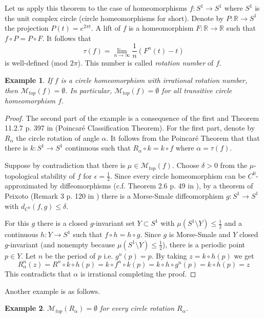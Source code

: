 \documentclass[11pt,letterpaper]{amsart}
\theoremstyle{plain}
\newtheorem{example}{Example}
\begin{document}
Let us apply this theorem to the case of homeomorphisms $f:S^1\to S^1$
where $S^1$ is the unit complex circle (circle homeomorphisms for short).
Denote by $P:\mathbb{R}\to S^1$ the projection
$P(t)=e^{2\pi t}$.
A lift of $f$ is a homeomorphism $F:\mathbb{R}\to \mathbb{R}$ such that
$f\circ P=P\circ F$.
It follows that
$$
\tau(f)=\lim_{n\to\infty}\frac{1}n(F^n(t)-t)
$$
is well-defined (mod $2\pi$).
This number is called {\em rotation number} of $f$.


\begin{example}
\label{parceria}
If $f$ is a circle homeomorphism with irrational rotation number, then
$\mathcal{M}_{top}(f)=\emptyset$. In particular, $\mathcal{M}_{top}(f)=\emptyset$ for all transitive circle homeomorphism $f$.
\end{example}

\begin{proof}
The second part of the example is a consequence of the first and Theorem 11.2.7 p. 397 in \cite{kh} (Poincar\'e Classification Theorem).
For the first part,
denote by $R_\alpha$ the circle rotation of angle $\alpha$.
It follows from the Poincar\'e Theorem that
that there is $k:S^1\to S^1$ continuous such that
$R_\alpha\circ k=k\circ f$ where $\alpha=\tau(f)$.

Suppose by contradiction that there is $\mu\in\mathcal{M}_{top}(f)$.
Choose $\delta>0$ from the $\mu$-topological stability of $f$ for
$\epsilon=\frac{1}2$.
Since every circle homeomorphism can be $C^0$-approximated by diffeomorphisms (c.f. Theorem 2.6 p. 49 in \cite{h}), by a theorem of Peixoto (Remark 3 p. 120 in \cite{p})
there is a Morse-Smale diffeomorphism $g:S^1\to S^1$
with $d_{C^0}(f,g)\leq\delta$.

For this $g$ there is a closed $g$-invariant set $Y\subset S^1$ with $\mu(S^1\setminus Y)\leq\frac{1}2$ and a continuous $h:Y\to S^1$ such that
$f\circ h=h\circ g$.
Since $g$ is Morse-Smale and $Y$ closed $g$-invariant (and nonempty because
$\mu(S^1\setminus Y)\leq\frac{1}2$), there is a periodic point $p\in Y$. Let $n$ be the period of $p$ i.e. $g^n(p)=p$.
By taking $z=k\circ h(p)$ we get
$$
R^n_\alpha(z)=R^n\circ k\circ h(p)=k\circ f^n\circ k(p)=k\circ h\circ g^n(p)=k\circ h(p)=z
$$
This contradicts that $\alpha$ is irrational completing the proof.
\end{proof}

Another example is as follows.

\begin{example}
$\mathcal{M}_{top}(R_\alpha)=\emptyset$ for every circle rotation $R_\alpha$.
\end{example}
\end{document}
